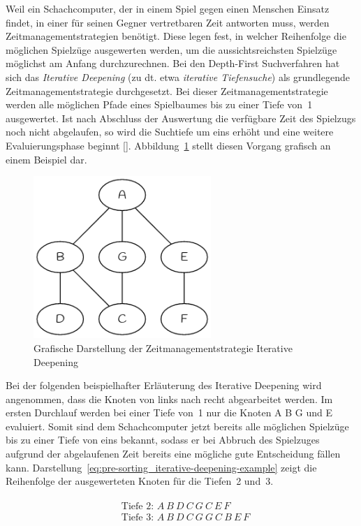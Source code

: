 Weil ein Schachcomputer, der in einem Spiel gegen einen Menschen Einsatz findet, in einer für seinen Gegner vertretbaren Zeit antworten muss, werden Zeitmanagementstrategien benötigt.
Diese legen fest, in welcher Reihenfolge die möglichen Spielzüge ausgewerten werden, um die aussichtsreichsten Spielzüge möglichst am Anfang durchzurechnen.
Bei den Depth-First Suchverfahren hat sich das \textit{Iterative Deepening} (zu dt. etwa \textit{iterative Tiefensuche}) als grundlegende Zeitmanagementstrategie durchgesetzt.
Bei dieser Zeitmanagementstrategie werden alle möglichen Pfade eines Spielbaumes bis zu einer Tiefe von~1 ausgewertet.
Ist nach Abschluss der Auswertung die verfügbare Zeit des Spielzugs noch nicht abgelaufen, so wird die Suchtiefe um eins erhöht und eine weitere Evaluierungsphase beginnt [\cite{Wiki2019a}].
Abbildung~\ref{fig:pre-sorting_iterative-deepening} stellt diesen Vorgang grafisch an einem Beispiel dar.

\begin{figure}[H]
    \centering
    \includegraphics[width=0.6\textwidth]{images/theory/pre-sorting_iterative-deepening.png}
    \caption[Grafische Darstellung der Zeitmanagementstrategie Iterative Deepening]{Grafische Darstellung der Zeitmanagementstrategie Iterative Deepening}
    \label{fig:pre-sorting_iterative-deepening}
\end{figure}

\noindent Bei der folgenden beispielhafter Erläuterung des Iterative Deepening wird angenommen, dass die Knoten von links nach recht abgearbeitet werden.
Im ersten Durchlauf werden bei einer Tiefe von~1 nur die Knoten A B G und E evaluiert.
Somit sind dem Schachcomputer jetzt bereits alle möglichen Spielzüge bis zu einer Tiefe von eins bekannt, sodass er bei Abbruch des Spielzuges aufgrund der abgelaufenen Zeit bereits eine mögliche gute Entscheidung fällen kann.
Darstellung~\ref{eq:pre-sorting_iterative-deepening-example} zeigt die Reihenfolge der ausgewerteten Knoten für die Tiefen~2 und~3.

\begin{align} \label{eq:pre-sorting_iterative-deepening-example}
\begin{split}
    & \text{Tiefe 2: } A\ B\ D\ C\ G\ C\ E\ F\\
    & \text{Tiefe 3: } A\ B\ D\ C\ G\ G\ C\ B\ E\ F
\end{split}
\end{align}
